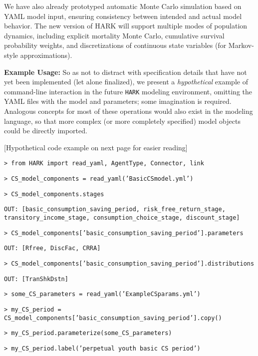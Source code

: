 \documentclass[12pt,pdftex,letterpaper]{article}
\begin{document}
We have also already prototyped automatic Monte Carlo simulation based on YAML model input, ensuring consistency between intended and actual model behavior. The new version of HARK will support multiple modes of population dynamics, including explicit mortality Monte Carlo, cumulative survival probability weights, and discretizations of continuous state variables (for Markov-style approximations).

\vspace{0.35cm}

\noindent \textbf{Example Usage:} So as not to distract with specification details that have not yet been implemented (let alone finalized), we present a \textit{hypothetical} example of command-line interaction in the future \texttt{HARK} modeling environment, omitting the YAML files with the model and parameters; some imagination is required. Analogous concepts for most of these operations would also exist in the modeling language, so that more complex (or more completely specified) model objects could be directly imported.

[Hypothetical code example on next page for easier reading]

\newpage

\texttt{> from HARK import read\_yaml, AgentType, Connector, link}

\texttt{> CS\_model\_components = read\_yaml('BasicCSmodel.yml')}

\texttt{> CS\_model\_components.stages}

\texttt{OUT: [basic\_consumption\_saving\_period, risk\_free\_return\_stage, transitory\_income\_stage, consumption\_choice\_stage, discount\_stage]}

\texttt{> CS\_model\_components['basic\_consumption\_saving\_period'].parameters}

\texttt{OUT: [Rfree, DiscFac, CRRA]}

\texttt{> CS\_model\_components['basic\_consumption\_saving\_period'].distributions}

\texttt{OUT: [TranShkDstn]}

\texttt{> some\_CS\_parameters = read\_yaml('ExampleCSparams.yml')}

\texttt{> my\_CS\_period = CS\_model\_components['basic\_consumption\_saving\_period'].copy()}

\texttt{> my\_CS\_period.parameterize(some\_CS\_parameters)}

\texttt{> my\_CS\_period.label('perpetual youth basic CS period')}
\end{document}
